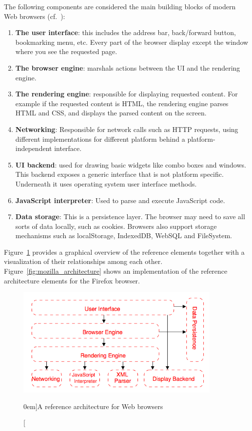 \documentclass[a4paper, justified, notoc]{tufte-handout} %
\begin{document}
The following components are considered the main building blocks of modern Web browsers (cf.~\citep{grosskurth:2006}):
\begin{enumerate}
	\item \textbf{The user interface}: this includes the address bar, back/forward button, bookmarking menu, etc. Every part of the browser display except the window where you see the requested page.
	\item \textbf{The browser engine}: marshals actions between the UI and the rendering engine.
	\item \textbf{The rendering engine}: responsible for displaying requested content. For example if the requested content is HTML, the rendering engine parses HTML and CSS, and displays the parsed content on the screen.
	\item \textbf{Networking}: Responsible for network calls such as HTTP requests, using different implementations for different platform behind a platform-independent interface.
	\item \textbf{UI backend}: used for drawing basic widgets like combo boxes and windows. This backend exposes a generic interface that is not platform specific. Underneath it uses operating system user interface methods.
	\item \textbf{JavaScript interpreter}: Used to parse and execute JavaScript code.
	\item \textbf{Data storage}: This is a persistence layer. The browser may need to save all sorts of data locally, such as cookies. Browsers also support storage mechanisms such as localStorage, IndexedDB, WebSQL and FileSystem.
\end{enumerate}

Figure~\ref{fig:reference_architecture} provides a graphical overview of the reference elements together with a visualization of their relationships among each other. Figure~\ref{fig:mozilla_architecture} shows an implementation of the reference architecture elements for the Firefox browser.


\begin{figure}%
	\centering
  \includegraphics[width=0.9\textwidth]{./figures/browser_reference_architecture.png}
  \caption[][0em]{A reference architecture for Web browsers~\citep{grosskurth:2006}}
  \label{fig:reference_architecture}
\end{figure}
\end{document}
